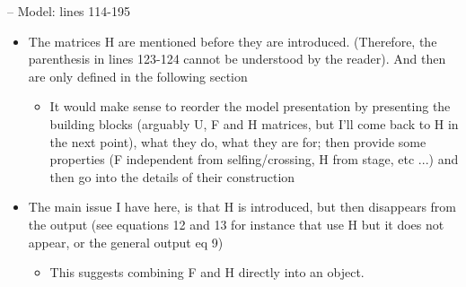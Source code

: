 \documentclass[11pt]{article}
\begin{document}
\noindent -- Model: lines 114-195
\begin{itemize}
	\item The matrices H are mentioned before they are introduced. (Therefore, the parenthesis in lines 123-124 cannot be understood by the reader). And then are only defined in the following section	
	\begin{itemize}
		\item It would make sense to reorder the model presentation by presenting the building blocks (arguably U, F and H matrices, but I'll come back to H in the next point), what they do, what they are for; then provide some properties (F independent from selfing/crossing, H from stage, etc ...) and then go into the details of their construction
	\end{itemize}
	\item The main issue I have here, is that H is introduced, but then disappears from the output (see equations 12 and 13 for instance that use H but it does not appear, or the general output eq 9)
	\begin{itemize}
		\item This suggests combining F and H directly into an object.
	\end{itemize}
\end{itemize}
\end{document}
